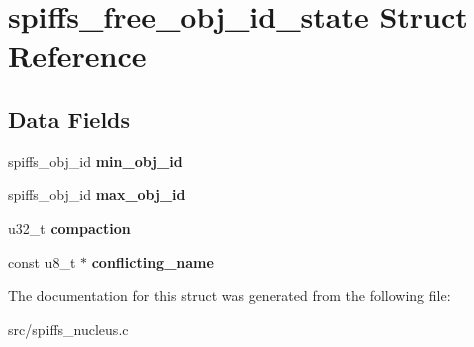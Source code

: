 \hypertarget{structspiffs__free__obj__id__state}{}\section{spiffs\+\_\+free\+\_\+obj\+\_\+id\+\_\+state Struct Reference}
\label{structspiffs__free__obj__id__state}
\subsection*{Data Fields}
\begin{DoxyCompactItemize}
\item 
\mbox{\label{structspiffs__free__obj__id__state_a2e23db65adf01c76cfb8dca971dbb565}} 
spiffs\+\_\+obj\+\_\+id {\bfseries min\+\_\+obj\+\_\+id}
\item 
\mbox{\label{structspiffs__free__obj__id__state_abe3e0e24350052b8c90aed697f23b6f7}} 
spiffs\+\_\+obj\+\_\+id {\bfseries max\+\_\+obj\+\_\+id}
\item 
\mbox{\label{structspiffs__free__obj__id__state_a4fe8c12907b7d0909f3ab4aa96a2fa42}} 
u32\+\_\+t {\bfseries compaction}
\item 
\mbox{\label{structspiffs__free__obj__id__state_a570a92aa2ae0ad99eaa0d15e872ca650}} 
const u8\+\_\+t $\ast$ {\bfseries conflicting\+\_\+name}
\end{DoxyCompactItemize}


The documentation for this struct was generated from the following file\+:\begin{DoxyCompactItemize}
\item 
src/spiffs\+\_\+nucleus.\+c\end{DoxyCompactItemize}
